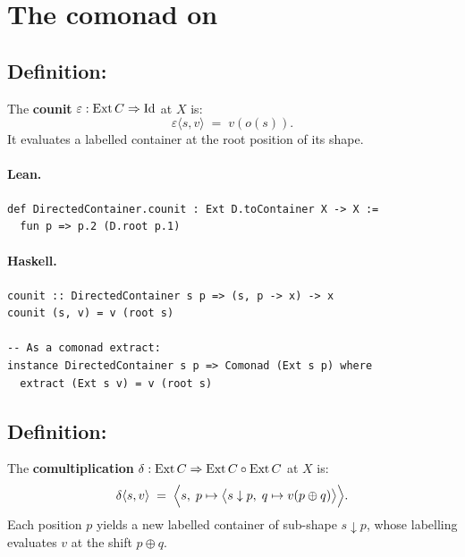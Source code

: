 \documentclass[11pt,a4paper]{article}
\begin{document}
\section{The comonad on }

\subsection{Definition: }

\begin{defn}[Counit]
The \textbf{counit} $\varepsilon : \mathrm{Ext}\,C \Rightarrow \mathrm{Id}$ at $X$ is:
\[
  \varepsilon\langle s, v \rangle \;=\; v(o(s)).
\]
It evaluates a labelled container at the root position of its shape.
\end{defn}

\paragraph{Lean.}
\begin{lstlisting}[style=lean]
def DirectedContainer.counit : Ext D.toContainer X -> X :=
  fun p => p.2 (D.root p.1)
\end{lstlisting}

\paragraph{Haskell.}
\begin{lstlisting}[style=haskell]
counit :: DirectedContainer s p => (s, p -> x) -> x
counit (s, v) = v (root s)

-- As a comonad extract:
instance DirectedContainer s p => Comonad (Ext s p) where
  extract (Ext s v) = v (root s)
\end{lstlisting}


\subsection{Definition: }

\begin{defn}[Comultiplication]
The \textbf{comultiplication} $\delta : \mathrm{Ext}\,C \Rightarrow \mathrm{Ext}\,C \circ \mathrm{Ext}\,C$
at $X$ is:
\[
  \delta\langle s, v \rangle \;=\;
  \Bigl\langle s,\; p \mapsto \bigl\langle s \downarrow p,\;
    q \mapsto v(p \oplus q) \bigr\rangle \Bigr\rangle.
\]
Each position $p$ yields a new labelled container of sub-shape $s \downarrow p$,
whose labelling evaluates $v$ at the shift $p \oplus q$.
\end{defn}
\end{document}

